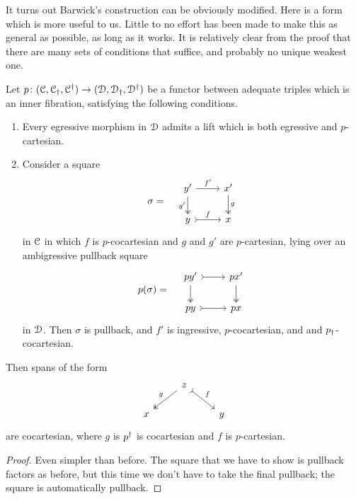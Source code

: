 \documentclass[main.tex]{subfiles}
\begin{document}
It turns out Barwick's construction can be obviously modified. Here is a form which is more useful to us. Little to no effort has been made to make this as general as possible, as long as it works. It is relatively clear from the proof that there are many sets of conditions that suffice, and probably no unique weakest one.

\begin{theorem}
  Let $p\colon (\mathcal{C}, \mathcal{C}_{\dagger}, \mathcal{C}^{\dagger}) \to (\mathcal{D}, \mathcal{D}_{\dagger}, \mathcal{D}^{\dagger})$ be a functor between adequate triples which is an inner fibration, satisfying the following conditions.
  \begin{enumerate}
    \item Every egressive morphism in $\mathcal{D}$ admits a lift which is both egressive and $p$-cartesian.

    \item Consider a square
      \begin{equation*}
          \sigma = \quad
          \begin{tikzcd}
            y'
            \arrow[r, "f'"]
            \arrow[d, two heads, swap, "g'"]
            & x'
            \arrow[d, two heads, "g"]
            \\
            y
            \arrow[r, rightarrowtail, "f"]
            & x
          \end{tikzcd}
      \end{equation*}
      in $\mathcal{C}$ in which $f$ is $p$-cocartesian and $g$ and $g'$ are $p$-cartesian, lying over an ambigressive pullback square
      \begin{equation*}
        p(\sigma) = \quad
        \begin{tikzcd}
          py'
          \arrow[r, rightarrowtail]
          \arrow[d, two heads]
          & px'
          \arrow[d, two heads]
          \\
          py
          \arrow[r, rightarrowtail]
          & px
        \end{tikzcd}
      \end{equation*}
      in $\mathcal{D}$. Then $\sigma$ is pullback, and $f'$ is ingressive, $p$-cocartesian, and and $p_{\dagger}$-cocartesian.
  \end{enumerate}
  Then spans of the form
  \begin{equation*}
    \begin{tikzcd}
      & z
      \arrow[dl, two heads, swap, "g"]
      \arrow[dr, rightarrowtail, "f"]
      \\
      x
      && y
    \end{tikzcd}
  \end{equation*}
  are cocartesian, where $g$ is $p^{\dagger}$ is cocartesian and $f$ is $p$-cartesian.
\end{theorem}
\begin{proof}
  Even simpler than before. The square that we have to show is pullback factors as before, but this time we don't have to take the final pullback; the square is automatically pullback.
\end{proof}
\end{document}
